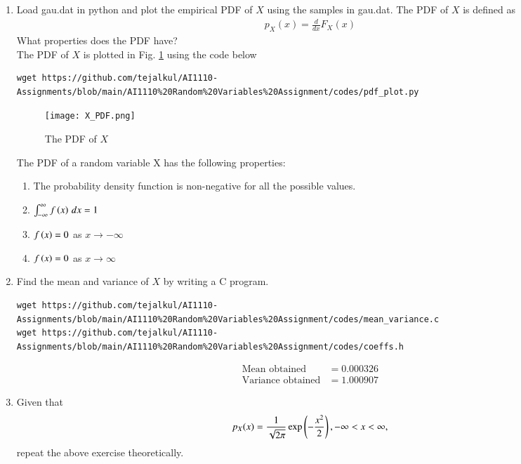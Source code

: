 \documentclass[journal,12pt,twocolumn]{IEEEtran}
\renewcommand\thesection{\arabic{section}}
\begin{document}
\begin{enumerate}[label=\thesection.\arabic*
,ref=\thesection.\theenumi]
The CDF of a random variable U has the following properties:
\begin{enumerate}
    \item $F_{U}\brak{x}$ is a non decreasing function of x where $-\infty < x < \infty$ 
    \item $F_{U}\brak{x}$ ranges from 0 to 1 
    \item $F_{U}\brak{x} = 0$ as $x \rightarrow -\infty$ 
    \item $F_{U}\brak{x} = 1$ as $x \rightarrow \infty$
\end{enumerate}
\item
Load gau.dat in python and plot the empirical PDF of $X$ using the samples in gau.dat. The PDF of $X$ is defined as
\begin{align}
p_{X}(x) = \frac{d}{dx}F_{X}(x)
\end{align}
What properties does the PDF have?
\\
\solution The PDF of $X$ is plotted in Fig. \ref{fig:gauss_pdf} using the code below
\begin{lstlisting}
wget https://github.com/tejalkul/AI1110-Assignments/blob/main/AI1110%20Random%20Variables%20Assignment/codes/pdf_plot.py
\end{lstlisting}
\begin{figure}
\centering
\texttt{[image: X\_PDF.png]}
\caption{The PDF of $X$}
\label{fig:gauss_pdf}
\end{figure}
The PDF of a random variable X has the following properties:
\begin{enumerate}
    \item The probability density function is non-negative for all the possible values. \\
    \item $ \int_{-\infty}^{\infty} f\left(x\right) \,dx  = 1 $ 
    \item $f\left(x\right) = 0$ as $x \rightarrow -\infty$
    \item $f\left(x\right) = 0$ as $x \rightarrow \infty$
\end{enumerate}
\item Find the mean and variance of $X$ by writing a C program.

\solution
\begin{lstlisting}
wget https://github.com/tejalkul/AI1110-Assignments/blob/main/AI1110%20Random%20Variables%20Assignment/codes/mean_variance.c
wget https://github.com/tejalkul/AI1110-Assignments/blob/main/AI1110%20Random%20Variables%20Assignment/codes/coeffs.h
\end{lstlisting}
\begin{align}
    \text{Mean obtained} &= 0.000326 \\
    \text{Variance obtained} &= 1.000907
\end{align}
\item Given that 
\begin{align}
p_{X}(x) = \frac{1}{\sqrt{2\pi}}\exp\left(-\frac{x^2}{2}\right), -\infty < x < \infty,
\end{align}
repeat the above exercise theoretically.
%
\end{enumerate}
\end{document}
